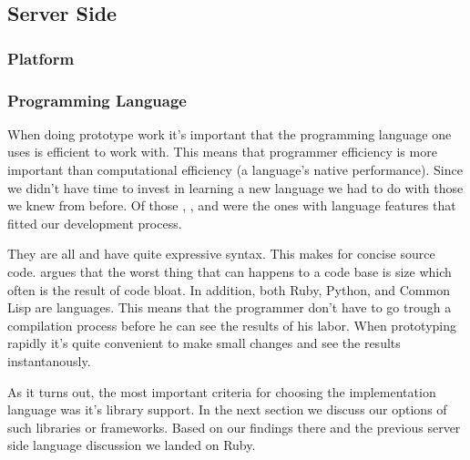 
\subsection{Server Side}

\subsubsection{Platform}

\subsubsection{Programming Language}

When doing prototype work it's important that the programming language one
uses is efficient to work with. This means that programmer efficiency is more
important than computational efficiency (a language's native performance).
Since we didn't have time to invest in learning a new language we had to do
with those we knew from before. Of those %
,
%
, and
%
were the ones with language features that fitted our development process.

They are all %
and have quite expressive syntax. This makes for concise source code.
\citet{yegge07} argues that the worst thing that can happens to a code base is
size which often is the result of code bloat. In addition, both Ruby, Python,
and Common Lisp are  languages. This means that the
programmer don't have to go trough a compilation process before he can see the
results of his labor. When prototyping rapidly it's quite convenient to make
small changes and see the results instantanously.




As it turns out, the most important criteria for choosing the implementation
language was it's library support. In the next section we discuss our options
of such libraries or frameworks. Based on our findings there and the
previous server side language discussion we landed on Ruby.

